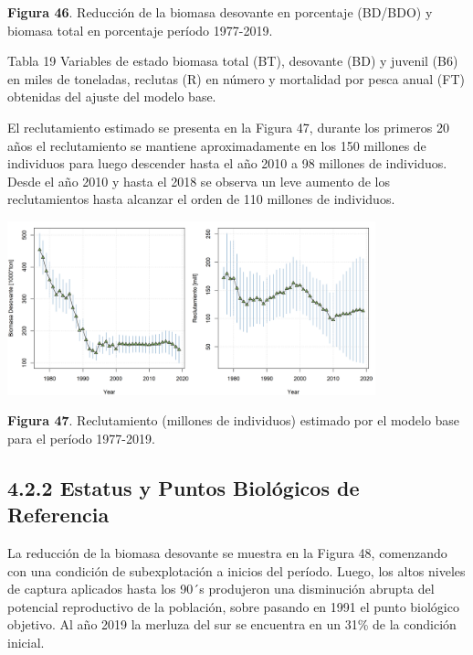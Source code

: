 \documentclass[
  spanish,
]{article}
\begin{document}
\small \textbf{Figura 46}. Reducción de la biomasa desovante en
porcentaje (BD/BDO) y biomasa total en porcentaje período 1977-2019.
\vspace{0.5cm} \normalsize

Tabla 19 Variables de estado biomasa total (BT), desovante (BD) y
juvenil (B6) en miles de toneladas, reclutas (R) en número y mortalidad
por pesca anual (FT) obtenidas del ajuste del modelo base.

El reclutamiento estimado se presenta en la Figura 47, durante los
primeros 20 años el reclutamiento se mantiene aproximadamente en los 150
millones de individuos para luego descender hasta el año 2010 a 98
millones de individuos. Desde el año 2010 y hasta el 2018 se observa un
leve aumento de los reclutamientos hasta alcanzar el orden de 110
millones de individuos.

\begin{center}
\includegraphics[width=0.8\textwidth]{Figuras/Figura_47.png}
\end{center}

\small \textbf{Figura 47}. Reclutamiento (millones de individuos)
estimado por el modelo base para el período 1977-2019. \vspace{0.5cm}
\normalsize

\hypertarget{estatus-y-puntos-bioluxf3gicos-de-referencia}{%
\subsection{4.2.2 Estatus y Puntos Biológicos de
Referencia}\label{estatus-y-puntos-bioluxf3gicos-de-referencia}}

La reducción de la biomasa desovante se muestra en la Figura 48,
comenzando con una condición de subexplotación a inicios del período.
Luego, los altos niveles de captura aplicados hasta los 90´s produjeron
una disminución abrupta del potencial reproductivo de la población,
sobre pasando en 1991 el punto biológico objetivo. Al año 2019 la
merluza del sur se encuentra en un 31\% de la condición inicial.
\end{document}
